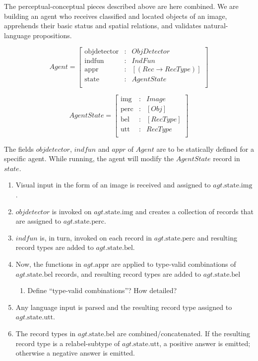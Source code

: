 \documentclass[11pt, a4paper]{article}
\begin{document}
The perceptual-conceptual pieces described above are here combined.
We are building an agent who receives classified and located objects of an image, apprehends their basic status and spatial relations, and validates natural-language propositions.

\begin{equation}\label{eq:agent}
Agent = \left[\begin{array}{rcl}
    \text{objdetector} &:& ObjDetector \\
    \text{indfun} &:& IndFun \\
    \text{appr} &:& [(Rec \rightarrow RecType)] \\
    \text{state} &:& AgentState \\
    \end{array}\right]
\end{equation}

\begin{equation}\label{eq:state}
AgentState = \left[\begin{array}{rcl}
    \text{img} &:& Image \\
    \text{perc} &:& [Obj] \\
    \text{bel} &:& [RecType] \\
    \text{utt} &:& RecType \\
    \end{array}\right]
\end{equation}

The fields $objdetector$, $indfun$ and $appr$ of $Agent$ are to be statically defined for a specific agent.
While running, the agent will modify the $AgentState$ record in $state$.

\begin{enumerate}
\item Visual input in the form of an image is received and assigned to $agt.\text{state}.\text{img}$.
\item $objdetector$ is invoked on $agt.\text{state.img}$ and creates a collection of records that are assigned to $agt.\text{state}.\text{perc}$.
\item $indfun$ is, in turn, invoked on each record in $agt.\text{state.perc}$ and resulting record types are added to $agt.\text{state.bel}$.
\item Now, the functions in $agt.\text{appr}$ are applied to type-valid combinations of $agt.\text{state.bel}$ records, and resulting record types are added to $agt.\text{state.bel}$
	\begin{enumerate}
	\item Define ``type-valid combinations''? How detailed?
	\end{enumerate}
\item Any language input is parsed and the resulting record type assigned to $agt.\text{state.utt}$.
\item The record types in $agt.\text{state.bel}$ are combined/concatenated. If the resulting record type is a relabel-subtype of $agt.\text{state.utt}$, a positive answer is emitted; otherwise a negative answer is emitted.
\end{enumerate}
\end{document}
